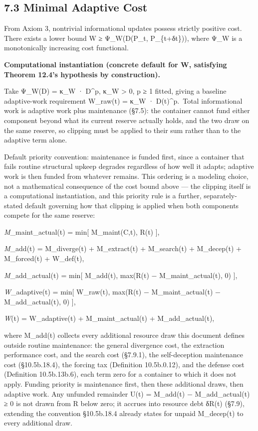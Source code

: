 \documentclass[
]{article}
\begin{document}
\hypertarget{minimal-adaptive-cost}{%
\subsection{7.3 Minimal Adaptive Cost}\label{minimal-adaptive-cost}}

From Axiom 3, nontrivial informational updates possess strictly positive
cost. There exists a lower bound W ≥ Ψ\_W(D(P\_t, P\_\{t+δt\})), where
Ψ\_W is a monotonically increasing cost functional.

\textbf{Computational instantiation (concrete default for W, satisfying
Theorem 12.4's hypothesis by construction).}

Take Ψ\_W(D) = κ\_W · D\^{}p, κ\_W \textgreater{} 0, p ≥ 1 fitted,
giving a baseline adaptive-work requirement W\_raw(t) = κ\_W ·
D(t)\^{}p.~Total informational work is adaptive work plus maintenance
(§7.5): the container cannot fund either component beyond what its
current reserve actually holds, and the two draw on the same reserve, so
clipping must be applied to their sum rather than to the adaptive term
alone.

Default priority convention: maintenance is funded first, since a
container that fails routine structural upkeep degrades regardless of
how well it adapts; adaptive work is then funded from whatever remains.
This ordering is a modeling choice, not a mathematical consequence of
the cost bound above --- the clipping itself is a computational
instantiation, and this priority rule is a further, separately-stated
default governing how that clipping is applied when both components
compete for the same reserve:

\emph{M}\_maint\_actual(t) = min{[} M\_maint(C,t), R(t) {]},

\emph{M}\_add(t) = M\_diverge(t) + M\_extract(t) + M\_search(t) +
M\_decep(t) + M\_forced(t) + W\_def(t),

\emph{M}\_add\_actual(t) = min{[} M\_add(t), max(R(t) −
M\_maint\_actual(t), 0) {]},

\emph{W}\_adaptive(t) = min{[} W\_raw(t), max(R(t) − M\_maint\_actual(t)
− M\_add\_actual(t), 0) {]},

\emph{W}(t) = W\_adaptive(t) + M\_maint\_actual(t) + M\_add\_actual(t),

where M\_add(t) collects every additional resource draw this document
defines outside routine maintenance: the general divergence cost, the
extraction performance cost, and the search cost (§7.9.1), the
self-deception maintenance cost (§10.5b.18.4), the forcing tax
(Definition 10.5b.0.12), and the defense cost (Definition 10.5b.13b.6),
each term zero for a container to which it does not apply. Funding
priority is maintenance first, then these additional draws, then
adaptive work. Any unfunded remainder U(t) = M\_add(t) −
M\_add\_actual(t) ≥ 0 is not drawn from R below zero; it accrues into
resource debt δR(t) (§7.9), extending the convention §10.5b.18.4 already
states for unpaid M\_decep(t) to every additional draw.
\end{document}
